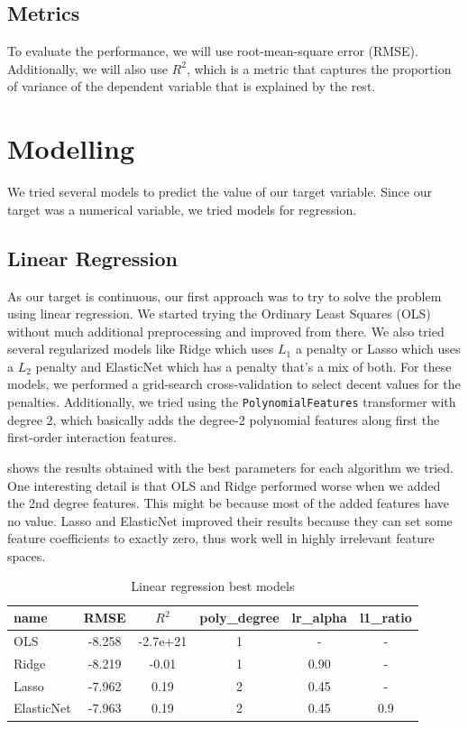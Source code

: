 \subsection{Metrics}
\label{ssub:metrics}

To evaluate the performance, we will use root-mean-square error (RMSE). Additionally, we will also use $R^2$, which is a metric that captures the proportion of variance of the dependent variable that is explained by the rest.

\pagebreak

\section{Modelling}%
\label{sub:results}

We tried several models to predict the value of our target variable. Since our target
was a numerical variable, we tried models for regression.
\subsection{Linear Regression}%
\label{ssub:linear-regression}

As our target is continuous, our first approach was to try to solve the problem using linear regression. We started trying the Ordinary Least Squares (OLS) without much additional preprocessing and improved from there. We also tried several regularized models like Ridge which uses $L_1$ a penalty or Lasso which uses a $L_2$ penalty and ElasticNet which has a penalty that's a mix of both. For these models, we performed a grid-search cross-validation to select decent values for the penalties. Additionally, we tried using the \texttt{PolynomialFeatures} transformer with degree 2, which basically adds the degree-2 polynomial features along first the first-order interaction features.

 shows the results obtained with the best parameters for each algorithm we tried. One interesting detail is that OLS and Ridge performed worse when we added the 2nd degree features. This might be because most of the added features have no value.  Lasso and ElasticNet improved their results because they can set some feature coefficients to exactly zero, thus work well in highly irrelevant feature spaces. 

\begin{table}[H]
    \centering
    \begin{tabular}{lccccc}
        \toprule
        name & RMSE & $R^2$ & poly\_degree &  lr\_alpha &  l1\_ratio \\
        \midrule
        OLS & -8.258 & -2.7e+21 &       1 &        -   &        - \\
        Ridge & -8.219 &  -0.01 &        1 &       0.90 &        - \\
        Lasso & -7.962 &  0.19  &         2 &       0.45 &        - \\
        ElasticNet & -7.963 &  0.19 &      2 &       0.45 &      0.9 \\
        \bottomrule
    \end{tabular}
    \caption{Linear regression best models}
    \label{ml:lr}
\end{table}


